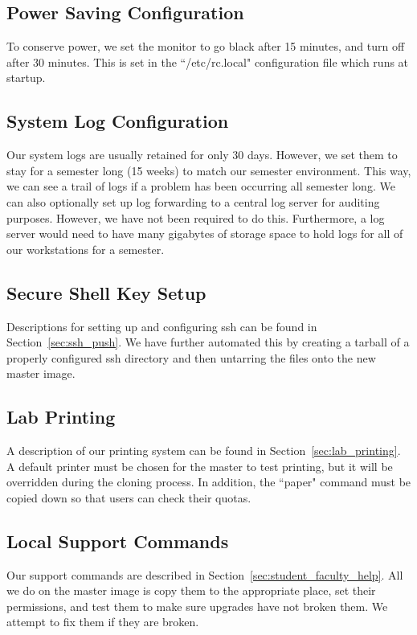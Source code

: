 \subsection{Power Saving Configuration}
To conserve power, we set the monitor to go black after 15 minutes, and turn off after 30 minutes.  This is set in the ``/etc/rc.local" configuration file which runs at startup.  

\subsection{System Log Configuration}
Our system logs are usually retained for only 30 days.  However, we set them to stay for a semester long (15 weeks) to match our semester environment.  This way, we can see a trail of logs if a problem has been occurring all semester long.  We can also optionally set up log forwarding to a central log server for auditing purposes.  However, we have not been required to do this.  Furthermore, a log server would need to have many gigabytes of storage space to hold logs for all of our workstations for a semester.  

\subsection{Secure Shell Key Setup}
Descriptions for setting up and configuring ssh can be found in Section~\ref{sec:ssh_push}.  We have further automated this by creating a tarball of a properly configured ssh directory and then untarring the files onto the new master image.  

\subsection{Lab Printing}
A description of our printing system can be found in Section~\ref{sec:lab_printing}.  A default printer must be chosen for the master to test printing, but it will be overridden during the cloning process.  In addition, the ``paper" command must be copied down so that users can check their quotas.  

\subsection{Local Support Commands}
Our support commands are described in Section~\ref{sec:student_faculty_help}.  All we do on the master image is copy them to the appropriate place, set their permissions, and test them to make sure upgrades have not broken them.  We attempt to fix them if they are broken. 

